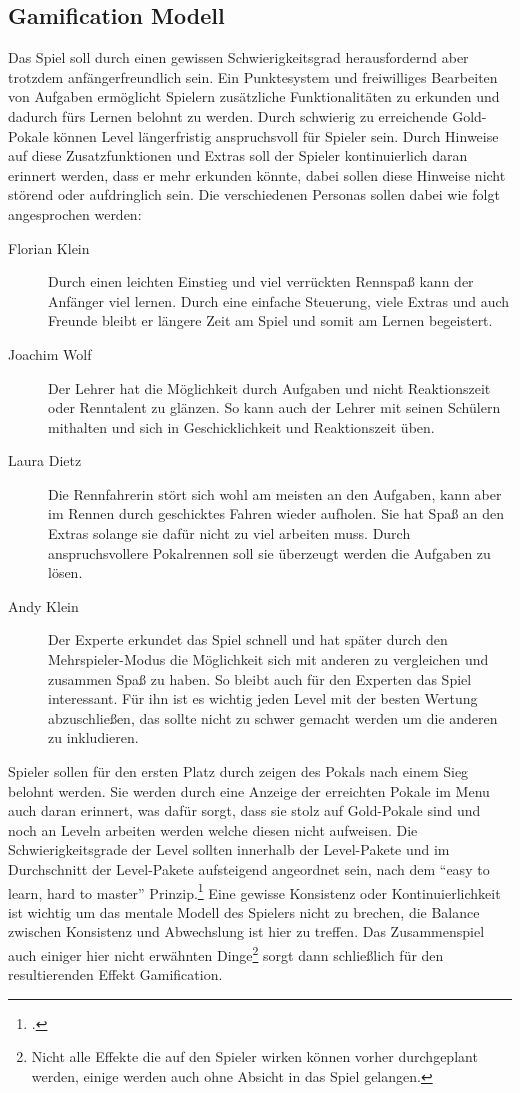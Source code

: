 \subsection{Gamification Modell}\label{ssec:gamification-modell}
	Das Spiel soll durch einen gewissen Schwierigkeitsgrad herausfordernd aber trotzdem anfängerfreundlich sein. Ein Punktesystem und freiwilliges Bearbeiten von Aufgaben ermöglicht Spielern zusätzliche Funktionalitäten zu erkunden und dadurch fürs Lernen belohnt zu werden. Durch schwierig zu erreichende Gold-Pokale können Level längerfristig anspruchsvoll für Spieler sein.
	Durch Hinweise auf diese Zusatzfunktionen und Extras soll der Spieler kontinuierlich daran erinnert werden, dass er mehr erkunden könnte, dabei sollen diese Hinweise nicht störend oder aufdringlich sein.
	Die verschiedenen Personas sollen dabei wie folgt angesprochen werden:
	\begin{description}
		\item[Florian Klein]{
			Durch einen leichten Einstieg und viel verrückten Rennspaß kann der Anfänger viel lernen. Durch eine einfache Steuerung, viele Extras und auch Freunde bleibt er längere Zeit am Spiel und somit am Lernen begeistert.
		}
		\item[Joachim Wolf]{
			Der Lehrer hat die Möglichkeit durch Aufgaben und nicht Reaktionszeit oder Renntalent zu glänzen. So kann auch der Lehrer mit seinen Schülern mithalten und sich in Geschicklichkeit und Reaktionszeit üben.
		}
		\item[Laura Dietz]{
			Die Rennfahrerin stört sich wohl am meisten an den Aufgaben, kann aber im Rennen durch geschicktes Fahren wieder aufholen. Sie hat Spaß an den Extras solange sie dafür nicht zu viel arbeiten muss. 
			Durch anspruchsvollere Pokalrennen soll sie überzeugt werden die Aufgaben zu lösen.
		}
		\item[Andy Klein]{
			Der Experte erkundet das Spiel schnell und hat später durch den Mehrspieler-Modus die Möglichkeit sich mit anderen zu vergleichen und zusammen Spaß zu haben. So bleibt auch für den Experten das Spiel interessant.
			Für ihn ist es wichtig jeden Level mit der besten Wertung abzuschließen, das sollte nicht zu schwer gemacht werden um die anderen zu inkludieren.
		}
	\end{description}
	Spieler sollen für den ersten Platz durch zeigen des Pokals nach einem Sieg belohnt werden. Sie werden durch eine Anzeige der erreichten Pokale im Menu auch daran erinnert, was dafür sorgt, dass sie stolz auf Gold-Pokale sind und noch an Leveln arbeiten werden welche diesen nicht aufweisen.
	Die Schwierigkeitsgrade der Level sollten innerhalb der Level-Pakete und im Durchschnitt der Level-Pakete aufsteigend angeordnet sein, nach dem \enquote{easy to learn, hard to master} Prinzip.\footcite[Bushnell's Law]{easy-to-learn-hard-to-master} Eine gewisse Konsistenz oder Kontinuierlichkeit ist wichtig um das mentale Modell des Spielers nicht zu brechen, die Balance zwischen Konsistenz und Abwechslung ist hier zu treffen.
	Das Zusammenspiel auch einiger hier nicht erwähnten Dinge\footnote{Nicht alle Effekte die auf den Spieler wirken können vorher durchgeplant werden, einige werden auch ohne Absicht in das Spiel gelangen.} sorgt dann schließlich für den resultierenden Effekt Gamification.


